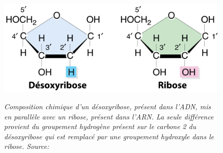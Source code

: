 \begin{figure}[htb]
  \centering
  {\includegraphics[width=0.8\linewidth]{./figures/ch1/desoxyribose_vs_ribose}}
    \caption[Comparaison composition chimique ADN/ARN]{\it Composition chimique d'un désoxyribose, présent dans l'ADN, mis en parallèle avec un ribose, présent dans l'ARN. La seule différence provient du groupement hydrogène présent sur le carbone 2 du désoxyribose qui est remplacé par une groupement hydroxyle dans le ribose. Source: \cite{russel2010igenetics}
    }
    \label{Fig:desoxyribose_vs_ribose}
  \hspace{0.2cm}
\end{figure}



